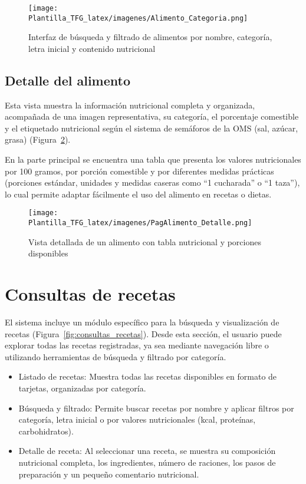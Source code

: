\begin{figure}[H]
    \centering
    \texttt{[image: Plantilla\_TFG\_latex/imagenes/Alimento\_Categoria.png]}
    \caption{Interfaz de búsqueda y filtrado de alimentos por nombre, categoría, letra inicial y contenido nutricional}
    \label{fig:Alimento_Categoria}
\end{figure}

\subsection{Detalle del alimento}
Esta vista muestra la información nutricional completa y organizada, acompañada de una imagen representativa, su categoría, el porcentaje comestible y el etiquetado nutricional según el sistema de semáforos de la OMS (sal, azúcar, grasa) (Figura~\ref{fig:detalle_alimento}).

En la parte principal se encuentra una tabla que presenta los valores nutricionales por 100 gramos, por porción comestible y por diferentes medidas prácticas (porciones estándar, unidades y medidas caseras como “1 cucharada” o “1 taza”), lo cual permite adaptar fácilmente el uso del alimento en recetas o dietas.

\begin{figure}[H]
    \centering
    \texttt{[image: Plantilla\_TFG\_latex/imagenes/PagAlimento\_Detalle.png]}
    \caption{Vista detallada de un alimento con tabla nutricional y porciones disponibles}
    \label{fig:detalle_alimento}
\end{figure}

\section{Consultas de recetas}
El sistema incluye un módulo específico para la búsqueda y visualización de recetas (Figura~\ref{fig:consultas_recetas}). Desde esta sección, el usuario puede explorar todas las recetas registradas, ya sea mediante navegación libre o utilizando herramientas de búsqueda y filtrado por categoría.

\begin{itemize}
    \item Listado de recetas: Muestra todas las recetas disponibles en formato de tarjetas, organizadas por categoría.

    \item Búsqueda y filtrado: Permite buscar recetas por nombre y aplicar filtros por categoría, letra inicial o por valores nutricionales (kcal, proteínas, carbohidratos).

    \item Detalle de receta: Al seleccionar una receta, se muestra su composición nutricional completa, los ingredientes, número de raciones, los pasos de preparación y un pequeño comentario nutricional.
\end{itemize}

